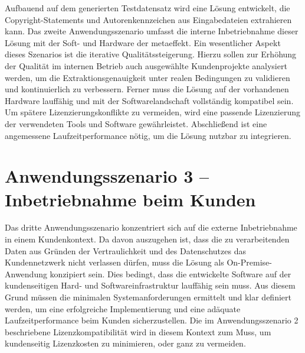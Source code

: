 Aufbauend auf dem generierten Testdatensatz wird eine Lösung entwickelt, die Copyright-Statements und Autorenkennzeichen aus Eingabedateien extrahieren kann.
Das zweite Anwendungsszenario umfasst die interne Inbetriebnahme dieser Lösung mit der Soft- und Hardware der metaeffekt.
Ein wesentlicher Aspekt dieses Szenarios ist die iterative Qualitätssteigerung.
Hierzu sollen zur Erhöhung der Qualität im internen Betrieb auch ausgewählte Kundenprojekte analysiert werden, um die Extraktionsgenauigkeit unter realen Bedingungen zu validieren und kontinuierlich zu verbessern.
Ferner muss die Lösung auf der vorhandenen Hardware lauffähig und mit der Softwarelandschaft vollständig kompatibel sein.
Um spätere Lizenzierungskonflikte zu vermeiden, wird eine passende Lizenzierung der verwendeten Tools und Software gewährleistet.
Abschließend ist eine angemessene Laufzeitperformance nötig, um die Lösung nutzbar zu integrieren.


\section{Anwendungsszenario 3 -- Inbetriebnahme beim Kunden}\label{sec:anwendungsszenario-3}

Das dritte Anwendungsszenario konzentriert sich auf die externe Inbetriebnahme in einem Kundenkontext.
Da davon auszugehen ist, dass die zu verarbeitenden Daten aus Gründen der Vertraulichkeit und des Datenschutzes das Kundennetzwerk nicht verlassen dürfen, muss die Lösung als On-Premise-Anwendung konzipiert sein.
Dies bedingt, dass die entwickelte Software auf der kundenseitigen Hard- und Softwareinfrastruktur lauffähig sein muss.
Aus diesem Grund müssen die minimalen Systemanforderungen ermittelt und klar definiert werden, um eine erfolgreiche Implementierung und eine adäquate Laufzeitperformance beim Kunden sicherzustellen.
Die im Anwendungsszenario 2 beschriebene Lizenzkompatibilität wird in diesem Kontext zum Muss, um kundenseitig Lizenzkosten zu minimieren, oder ganz zu vermeiden.
